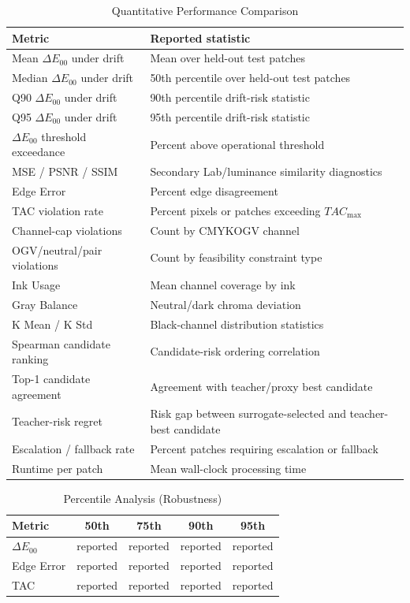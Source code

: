 \documentclass[11pt]{article}
\begin{document}
\begin{table}[htbp]
\centering
\caption{Quantitative Performance Comparison}
\label{tab:quant_results}
\begin{tabular}{p{}p{}}
\toprule
Metric & Reported statistic \\
\midrule
Mean $\Delta E_{00}$ under drift & Mean over held-out test patches \\
Median $\Delta E_{00}$ under drift & 50th percentile over held-out test patches \\
Q90 $\Delta E_{00}$ under drift & 90th percentile drift-risk statistic \\
Q95 $\Delta E_{00}$ under drift & 95th percentile drift-risk statistic \\
$\Delta E_{00}$ threshold exceedance & Percent above operational threshold \\
MSE / PSNR / SSIM & Secondary Lab/luminance similarity diagnostics \\
Edge Error & Percent edge disagreement \\
TAC violation rate & Percent pixels or patches exceeding $TAC_{\max}$ \\
Channel-cap violations & Count by CMYKOGV channel \\
OGV/neutral/pair violations & Count by feasibility constraint type \\
Ink Usage & Mean channel coverage by ink \\
Gray Balance & Neutral/dark chroma deviation \\
K Mean / K Std & Black-channel distribution statistics \\
Spearman candidate ranking & Candidate-risk ordering correlation \\
Top-1 candidate agreement & Agreement with teacher/proxy best candidate \\
Teacher-risk regret & Risk gap between surrogate-selected and teacher-best candidate \\
Escalation / fallback rate & Percent patches requiring escalation or fallback \\
Runtime per patch & Mean wall-clock processing time \\
\bottomrule
\end{tabular}
\end{table}

\begin{table}[htbp]
\centering
\caption{Percentile Analysis (Robustness)}
\label{tab:percentile_robustness}
\begin{tabular}{lcccc}
\toprule
Metric & 50th & 75th & 90th & 95th \\
\midrule
$\Delta E_{00}$ & reported & reported & reported & reported \\
Edge Error & reported & reported & reported & reported \\
TAC & reported & reported & reported & reported \\
\bottomrule
\end{tabular}
\end{table}
\end{document}
